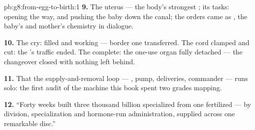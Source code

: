\begin{solution}{pb:g8:from-egg-to-birth:1}
\textbf{9.} The uterus --- the body's strongest ;
its tasks: opening the way, and pushing the baby down the
canal; the orders came as , the baby's and
mother's chemistry in dialogue.

\textbf{10.} The cry:  filled and working ---
border one transferred. The cord clamped and cut: the
's traffic ended. The  complete: the
one-use organ fully detached --- the changeover closed
with nothing left behind.

\textbf{11.} That the supply-and-removal loop --- ,
pump, deliveries, commander --- runs solo: the first
audit of the machine this book spent two grades mapping.

\textbf{12.} ``Forty weeks built three thousand billion
specialized  from one fertilized  --- by
division, specialization and hormone-run administration,
supplied across one remarkable disc.''
\end{solution}
